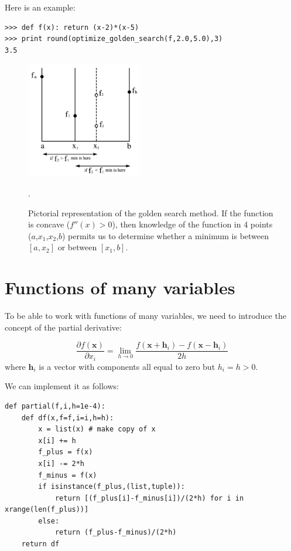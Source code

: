 \documentclass[justified,sixbynine]{tufte-book}
\def\ft{\small\tt}
\theoremstyle{plain}%
\theoremstyle{definition}
\theoremstyle{remark}
\begin{document}
\begin{fullwidth}
Here is an example:

\begin{lstlisting}[caption={in file: {\ft nlib.py}}]
>>> def f(x): return (x-2)*(x-5)
>>> print round(optimize_golden_search(f,2.0,5.0),3)
3.5
\end{lstlisting}

\begin{figure}[ht]
\centering\includegraphics[width=2in]{images/golden.png}
\caption{Pictorial representation of the golden search method. If the function is concave ($f''(x)>0$), then knowledge of the function in 4 points ($a$,$x_1$,$x_2$,$b$) permits us to determine whether a minimum is between $[a,x_2]$ or between $[x_1,b]$.\label{golden-pic}}.
\end{figure}

\goodbreak\section{Functions of many variables}


To be able to work with functions of many variables, we need to introduce the concept of the partial derivative:

\begin{equation}
\frac{\partial f(\mathbf{x})}{\partial x_i} = \lim_{h \rightarrow 0} \frac{f(\mathbf{x}+\mathbf{h}_i) - f(\mathbf{x}-\mathbf{h}_i)}{2h}
\end{equation}
where $\mathbf{h}_i$ is a vector with components all equal to zero but $h_i = h > 0$.

We can implement it as follows:

\begin{lstlisting}[caption={in file: {\ft nlib.py}}]
def partial(f,i,h=1e-4):
    def df(x,f=f,i=i,h=h):
        x = list(x) # make copy of x
        x[i] += h
        f_plus = f(x)
        x[i] -= 2*h
        f_minus = f(x)
        if isinstance(f_plus,(list,tuple)):
            return [(f_plus[i]-f_minus[i])/(2*h) for i in xrange(len(f_plus))]
        else:
            return (f_plus-f_minus)/(2*h)
    return df
\end{lstlisting}


\end{fullwidth}
\end{document}
